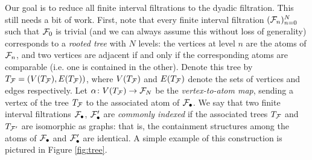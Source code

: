 Our goal is to reduce all finite interval filtrations to the dyadic filtration.
This still needs a bit of work.
First, note that every finite interval filtration $(\mathcal{F}_{n})_{n=0}^{N}$ such that $\mathcal{F}_{0}$ is trivial (and we can always assume this without loss of generality) corresponds to a \emph{rooted tree} with $N$ levels: the vertices at level $n$ are the atoms of $\mathcal{F}_{n}$, and two vertices are adjacent if and only if the corresponding atoms are comparable (i.e. one is contained in the other).
Denote this tree by $T_{\mathcal{F}} = (V(T_{\mathcal{F}}), E(T_{\mathcal{F}}))$, where $V(T_{\mathcal{F}})$ and $E(T_{\mathcal{F}})$ denote the sets of vertices and edges respectively.
Let $\alpha \colon V(T_{\mathcal{F}}) \to \mathcal{F}_{N}$ be the \emph{vertex-to-atom map}, sending a vertex of the tree $T_{\mathcal{F}}$ to the associated atom of $\mathcal{F}_{\bullet}$.
We say that two finite interval filtrations $\mathcal{F}_{\bullet}$, $\mathcal{F}'_{\bullet}$ are \emph{commonly indexed} if the associated trees $T_{\mathcal{F}}$ and $T_{\mathcal{F}'}$ are isomorphic as graphs: that is, the containment structures among the atoms of $\mathcal{F}_{\bullet}$ and $\mathcal{F}'_{\bullet}$ are identical.
A simple example of this construction is pictured in Figure \ref{fig:tree}.

